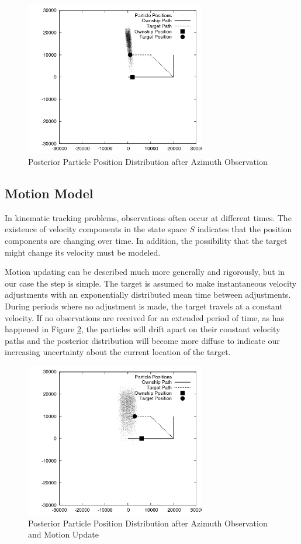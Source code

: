 \documentclass{article}
\begin{document}
\begin{figure}
\centering
\includegraphics[width=0.7\textwidth]{data/particles_azimuth_obs.png}
\caption{Posterior Particle Position Distribution after Azimuth Observation}
\label{posterior1}
\end{figure}

\subsection{Motion Model}
In kinematic tracking problems, observations often occur at different times. The existence of velocity components in the state space \(S\) indicates that the position components are changing over time. In addition, the possibility that the target might change its velocity must be modeled.

Motion updating can be described much more generally and rigorously, but in our case the step is simple. The target is assumed to make instantaneous velocity adjustments with an exponentially distributed mean time between adjustments. During periods where no adjustment is made, the target travels at a constant velocity. If no observations are received for an extended period of time, as has happened in Figure \ref{posterior2}, the particles will drift apart on their constant velocity paths and the posterior distribution will become more diffuse to indicate our increasing uncertainty about the current location of the target.

\begin{figure}
\centering
\includegraphics[width=0.7\textwidth]{data/particles_motion.png}
\caption{Posterior Particle Position Distribution after Azimuth Observation and Motion Update}
\label{posterior2}
\end{figure}
\end{document}
